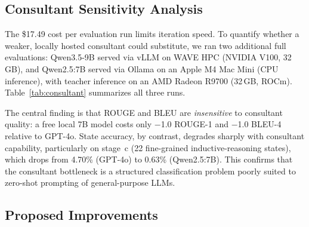 \documentclass[11pt]{article}
\begin{document}
\subsection{Consultant Sensitivity Analysis}

The \$17.49 cost per evaluation run limits iteration speed. To quantify whether a weaker, locally hosted consultant could substitute, we ran two additional full evaluations: Qwen3.5-9B served via vLLM on WAVE HPC (NVIDIA V100, 32\,GB), and Qwen2.5:7B served via Ollama on an Apple M4 Mac Mini (CPU inference), with teacher inference on an AMD Radeon R9700 (32\,GB, ROCm). Table~\ref{tab:consultant} summarizes all three runs.

\begin{table}[t]
  \centering
  \small
  \caption{Consultant sensitivity across the 681-dialogue test split. ROUGE/BLEU varies by at most 1.0 R-1 across all runs, while state accuracy drops 11 points as consultant capability decreases from GPT-4o to Qwen2.5:7B. Text-overlap is driven by the fixed SocratTeachLLM teacher; state accuracy is the consultant-sensitive signal.}
  \label{tab:consultant}
\end{table}

The central finding is that ROUGE and BLEU are \emph{insensitive} to consultant quality: a free local 7B model costs only $-$1.0 ROUGE-1 and $-$1.0 BLEU-4 relative to GPT-4o. State accuracy, by contrast, degrades sharply with consultant capability, particularly on stage~c (22 fine-grained inductive-reasoning states), which drops from 4.70\% (GPT-4o) to 0.63\% (Qwen2.5:7B). This confirms that the consultant bottleneck is a structured classification problem poorly suited to zero-shot prompting of general-purpose LLMs.

\subsection{Proposed Improvements}
\label{sec:proposed-improvements}
\end{document}
